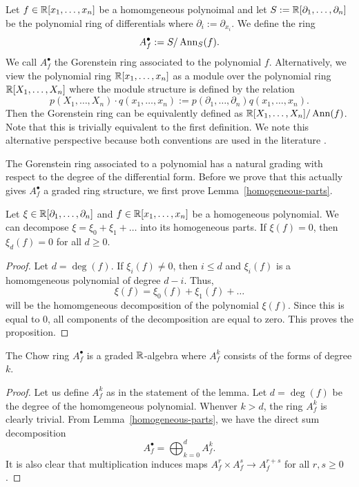 \documentclass{puthesis-UG}
\begin{document}
\begin{defn}
	Let $f \in \mathbb{R}[x_1, \ldots, x_n]$ be a homomgeneous polynoimal and let $S := \mathbb{R}[\partial_1, \ldots, \partial_n]$ be the polynomial ring of differentials where $\partial_i := \partial_{x_i}$. We define the ring 
	\[
		A_f^\bullet := S / \operatorname{Ann}_S (f).
	\]
	We call $A_f^\bullet$ the Gorenstein ring associated to the polynomial $f$. Alternatively, we view the polynomial ring $\mathbb{R}[x_1, \ldots, x_n]$ as a module over the polynomial ring $\mathbb{R}[X_1, \ldots, X_n]$ where the module structure is defined by the relation
	\[
		p(X_1, \ldots, X_n) \cdot q(x_1, \ldots, x_n) := p(\partial_1, \ldots, \partial_n) q(x_1, \ldots, x_n). 
	\]
	Then the Gorenstein ring can be equivalently defined as $\mathbb{R}[X_1, \ldots, X_n] / \operatorname{Ann} (f)$. Note that this is trivially equivalent to the first definition. We note this alternative perspective because both conventions are used in the literature \cite{MNY,MN-gorenstein}. 
\end{defn}

The Gorenstein ring associated to a polynomial has a natural grading with respect to the degree of the differential form. Before we prove that this actually gives $A_f^\bullet$ a graded ring structure, we first prove Lemma~\ref{homogeneous-parts}.

\begin{lem} \label{homogeneous-parts}
	Let $\xi \in \mathbb{R}[\partial_1, \ldots, \partial_n]$ and $f \in \mathbb{R}[x_1, \ldots, x_n]$ be a homogeneous polynomial. We can decompose $\xi = \xi_0 + \xi_1 + \ldots$ into its homogeneous parts. If $\xi (f) = 0$, then $\xi_d (f) = 0$ for all $d \geq 0$. 
\end{lem}

\begin{proof}
	Let $d = \deg (f)$. If $\xi_i (f) \neq 0$, then $i \leq d$ and $\xi_i(f)$ is a homomgeneous polynomial of degree $d-i$. Thus, 
	\[
		\xi (f) = \xi_0 (f) + \xi_1(f) + \ldots
	\]
	will be the homomgeneous decomposition of the polynomial $\xi(f)$. Since this is equal to $0$, all components of the decomposition are equal to zero. This proves the proposition. 
\end{proof}

\begin{prop}
	The Chow ring $A_f^\bullet$ is a graded $\mathbb{R}$-algebra where $A_f^k$ consists of the forms of degree $k$. 
\end{prop}

\begin{proof}
	Let us define $A_f^k$ as in the statement of the lemma. Let $d = \deg (f)$ be the degree of the homomgeneous polynomial. Whenver $k > d$, the ring $A_f^k$ is clearly trivial. From Lemma~\ref{homogeneous-parts}, we have the direct sum decomposition 
	\[
		A_f^\bullet = \bigoplus_{k = 0}^d A_f^k.
	\]
	It is also clear that multiplication induces maps $A_f^r \times A_f^s \to A_f^{r+s}$ for all $r, s \geq 0$.
\end{proof}
\end{document}
